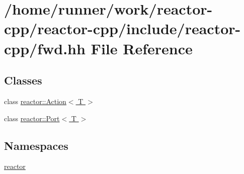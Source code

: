 \hypertarget{fwd_8hh}{}\section{/home/runner/work/reactor-\/cpp/reactor-\/cpp/include/reactor-\/cpp/fwd.hh File Reference}
\label{fwd_8hh}
\subsection*{Classes}
\begin{DoxyCompactItemize}
\item 
class \hyperlink{classreactor_1_1Action}{reactor\+::\+Action$<$ T $>$}
\item 
class \hyperlink{classreactor_1_1Port}{reactor\+::\+Port$<$ T $>$}
\end{DoxyCompactItemize}
\subsection*{Namespaces}
\begin{DoxyCompactItemize}
\item 
 \hyperlink{namespacereactor}{reactor}
\end{DoxyCompactItemize}
